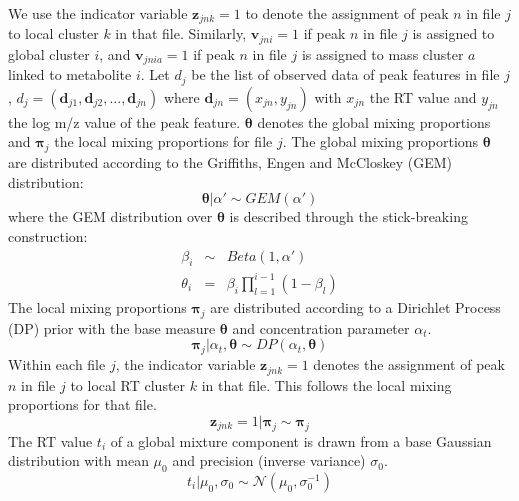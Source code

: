 We use the indicator variable $\boldsymbol{z}_{jnk}=1$ to denote the assignment of peak $n$ in file $j$ to local cluster $k$ in that file. Similarly, $\boldsymbol{v}_{jni}=1$ if peak $n$ in file $j$ is assigned to global cluster $i$, and $\boldsymbol{v}_{jnia}=1$ if peak $n$ in file $j$ is assigned to mass cluster $a$ linked to metabolite $i$. Let $d_{j}$ be the list of observed data of peak features in file $j$, $d_{j}=(\mathbf{d}_{j1},\mathbf{d}_{j2},...,\mathbf{d}_{jn})$ where $\mathbf{d}_{jn}=(x_{jn},y_{jn})$ with $x_{jn}$ the RT value and $y_{jn}$ the log m/z value of the peak feature. $\boldsymbol{\theta}$ denotes the global mixing proportions and $\boldsymbol{\pi}_{j}$ the local mixing proportions for file $j$. The global mixing proportions $\boldsymbol{\theta}$ are distributed according to the Griffiths, Engen and McCloskey (GEM) distribution:
\begin{equation}
    \boldsymbol{\theta}|\alpha'\sim GEM(\alpha')
\end{equation}
where the GEM distribution over $\boldsymbol{\theta}$ is described through the stick-breaking construction: 
\begin{eqnarray}
	\beta_{i} & \sim & Beta(1,\alpha')\\
	\theta_{i} & = & \beta_{i}\prod_{l=1}^{i-1}(1-\beta_{l})
\end{eqnarray}
The local mixing proportions $\boldsymbol{\pi}_{j}$ are distributed according to a Dirichlet Process (DP) prior with the base measure $\boldsymbol{\theta}$ and concentration parameter $\alpha_{t}$. 
\begin{equation}
	\boldsymbol{\pi}_{j}|\alpha_{t},\boldsymbol{\theta}\sim DP(\alpha_{t},\boldsymbol{\theta})
\end{equation}
Within each file $j$, the indicator variable $\boldsymbol{z}_{jnk}=1$ denotes the assignment of peak $n$ in file $j$ to local RT cluster $k$ in that file. This follows the local mixing proportions for that file.
\begin{equation}
	\boldsymbol{z}_{jnk}=1|\boldsymbol{\pi}_{j}\sim\boldsymbol{\pi}_{j}
\end{equation}
The RT value $t_{i}$ of a global mixture component is drawn from a base Gaussian distribution with mean $\mu_{0}$ and precision (inverse variance) $\sigma_{0}$. 
\begin{equation}
	t_{i}|\mu_{0},\sigma_{0}\sim\mathcal{N}(\mu_{0},\sigma_{0}^{-1})\label{eq:draw_ti}
\end{equation}
